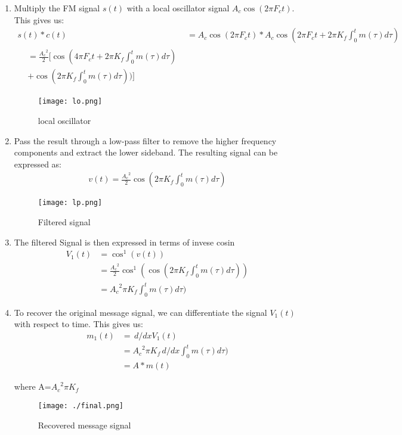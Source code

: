 \documentclass[journal,5pt,twocolumn]{IEEEtran}
\begin{document}
\begin{enumerate}
 \item    Multiply the FM signal $s(t)$ with a local oscillator signal $A_c\cos(2\pi F_ct)$. This gives us:
 \begin{align}   
    s(t)*c(t)& = A_c \cos(2 \pi F_c t )*  A_c \cos (2 \pi F_c t +2\pi K_{f} \int_{0}^t m(\tau) d\tau) \\
    \begin{split}
    &=\frac{{A_c}^2}{2}[\cos (4 \pi F_c t +2\pi K_{f} \int_{0}^t m(\tau) d\tau)\\ & + \cos (2\pi K_{f} \int_{0}^t m(\tau) d\tau))]  
    \end{split}
    \end{align}
    
    \begin{figure}
\centering 
\texttt{[image: lo.png]} 
\caption{local oscillator}
\label{fig:lo}
\end{figure}

\item    Pass the result through a low-pass filter to remove the higher frequency components and extract the lower sideband. The resulting signal can be expressed as:
    \begin{align*}
     v(t)=\frac{{A_c}^2}{2}\cos (2\pi K_{f} \int_{0}^t m(\tau) d\tau)
    \end{align*}
    \begin{figure}
\centering 
\texttt{[image: lp.png]} 
\caption{Filtered signal}
\label{fig:LPF}
\end{figure}
\item  The filtered Signal is then expressed in terms of invese cosin
  \begin{align*}
  {V_1}(t)&=\cos^1(v(t))\\
  &=\frac{{A_c}^2}{2}\cos^1(\cos (2\pi K_{f} \int_{0}^t m(\tau) d\tau))\\
  &={A_c}^2\pi K_{f} \int_{0}^t m(\tau) d\tau)
  \end{align*}


 \item   To recover the original message signal, we can differentiate the signal $V_1(t)$ with respect to time. This gives us:
\begin{align}
m_1(t)&= \,d/dxV_1(t)\\
&={A_c}^2\pi K_{f} \,d/dx \int_{0}^t m(\tau) d\tau)\\
&=A * m(t)
\end{align}

where A=${A_c}^2\pi K_{f}$

\begin{figure}
\centering 
\texttt{[image: ./final.png]}
\caption{Recovered message signal}
\label{fig:final}
\end{figure}
\end{enumerate}
\end{document}
